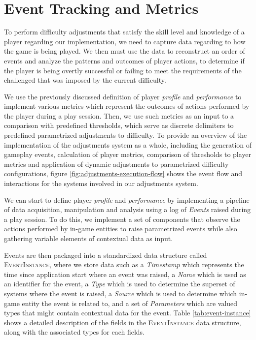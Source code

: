 

\section{Event Tracking and Metrics}

To perform difficulty adjustments that satisfy the skill level and knowledge of a player regarding our implementation, we need to capture data regarding to how the game is being played. We then must use the data to reconstruct an order of events and analyze the patterns and outcomes of player actions, to determine if the player is being overtly successful or failing to meet the requirements of the challenged that was imposed by the current difficulty.

We use the previously discussed definition of player \emph{profile} and \emph{performance} to implement various metrics which represent the outcomes of actions performed by the player during a play session. Then, we use such metrics as an input to a comparison with predefined thresholds, which serve as discrete delimiters to predefined parametrized adjustments to difficulty. To provide an overview of the implementation of the adjustments system as a whole, including the generation of gameplay events, calculation of player metrics, comparison of thresholds to player metrics and application of dynamic adjustments to parametrized difficulty configurations, figure \ref{fig:adjustments-execution-flow} shows the event flow and interactions for the systems involved in our adjustments system.



We can start to define player \emph{profile} and \emph{performance} by implementing a pipeline of data acquisition, manipulation and analysis using a log of \emph{Events} raised during a play session. To do this, we implement a set of components that observe the actions performed by in-game entities to raise parametrized events while also gathering variable elements of contextual data as input.

Events are then packaged into a standardized data structure called \textsc{EventInstance}, where we store data such as a \emph{Timestamp} which represents the time since application start where an event was raised, a \emph{Name} which is used as an identifier for the event, a \emph{Type} which is used to determine the superset of systems where the event is raised, a \emph{Source} which is used to determine which in-game entity the event is related to, and a set of \emph{Parameters} which are valued types that might contain contextual data for the event. Table \ref{tab:event-instance} shows a detailed description of the fields in the \textsc{EventInstance} data structure, along with the associated types for each fields.

